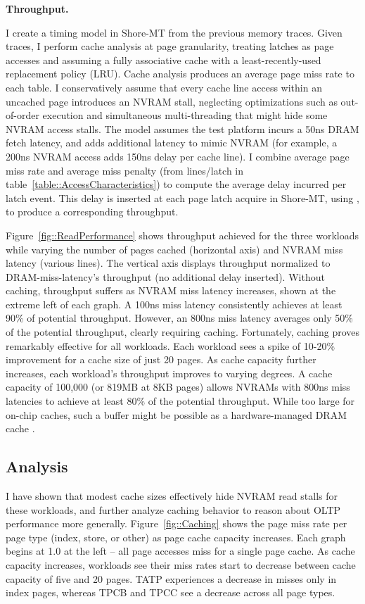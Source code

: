 \textbf{Throughput.}

I create a timing model in Shore-MT from the previous memory traces.
Given traces, I perform cache analysis at page granularity, treating latches as page accesses and assuming a fully associative cache with a least-recently-used replacement policy (LRU).
Cache analysis produces an average page miss rate to each table.
I conservatively assume that every cache line access within an uncached page introduces an NVRAM stall, neglecting optimizations such as out-of-order execution and simultaneous multi-threading that might hide some NVRAM access stalls. 
The model assumes the test platform incurs a 50ns DRAM fetch latency, and adds additional latency to mimic NVRAM (for example, a 200ns NVRAM access adds 150ns delay per cache line).
I combine average page miss rate and average miss penalty (from lines/latch in table~\ref{table::AccessCharacteristics}) to compute the average delay incurred per latch event.
This delay is inserted at each page latch acquire in Shore-MT, using \InPlace, to produce a corresponding throughput.

Figure~\ref{fig::ReadPerformance} shows throughput achieved for the three workloads while varying the number of pages cached (horizontal axis) and NVRAM miss latency (various lines).
The vertical axis displays throughput normalized to DRAM-miss-latency's throughput (no additional delay inserted).
Without caching, throughput suffers as NVRAM miss latency increases, shown at the extreme left of each graph.
A 100ns miss latency consistently achieves at least 90\% of potential throughput.
However, an 800ns miss latency averages only 50\% of the potential throughput, clearly requiring caching.
Fortunately, caching proves remarkably effective for all workloads.
Each workload sees a spike of 10-20\% improvement for a cache size of just 20 pages.
As cache capacity further increases, each workload's throughput improves to varying degrees.
A cache capacity of 100,000 (or 819MB at 8KB pages) allows NVRAMs with 800ns miss latencies to achieve at least 80\% of the potential throughput.
While too large for on-chip caches, such a buffer might be possible as a hardware-managed DRAM cache \cite{QureshiSrinivasan09}.

\subsection{Analysis}
\label{sec:OLTP_eval:Reads:Analysis}

I have shown that modest cache sizes effectively hide NVRAM read stalls for these workloads, and further analyze caching behavior to reason about OLTP performance more generally.
Figure~\ref{fig::Caching} shows the page miss rate per page type (index, store, or other) as page cache capacity increases.
Each graph begins at 1.0 at the left -- all page accesses miss for a single page cache.
As cache capacity increases, workloads see their miss rates start to decrease between cache capacity of five and 20 pages.
TATP experiences a decrease in misses only in index pages, whereas TPCB and TPCC see a decrease across all page types.

